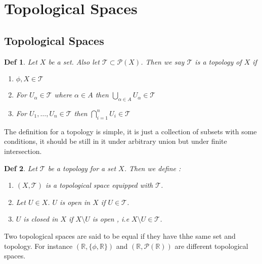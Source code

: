 \documentclass[paper=a4, fontsize=11pt]{scrartcl}
\newcommand{\T}{\mathcal{T}}
\newtheorem{definition}{Def}
\begin{document}
\vspace{0.15in}
\section{Topological Spaces}
\vspace{0.15in}

\subsection{Topological Spaces}
\vspace{0.1in}

\begin{definition}
	Let $X$ be a set. Also let $\mathcal{T}\subset \mathcal{P}(X)$. Then we say $\mathcal{T}$ is a topology of $X$ if 
	\begin{enumerate}\nonumber
		\item $\phi,X \in \T$
		\item For $U_\alpha \in \T$ where $\alpha \in A$ then $\bigcup\limits_{\alpha \in A} U_\alpha \in \T$
		\item For $U_1,\dots,U_n \in \T$ then $\bigcap\limits_{i=1}^n U_i \in \T$ \\
	\end{enumerate} 
\end{definition}

The definition for a topology is simple, it is just a collection of subsets with some conditions, it should be still in it under arbitrary union but under finite intersection.

\vspace{0.15in}

\begin{definition}
	Let $\T$ be a topology for a set $X$. Then we define :
	\begin{enumerate}[label=\arabic*)]
		\item $(X,\T)$ is a topological space equipped with $\T$.
		\item Let $U \in X$. $U$ is open in $X$ if $U\in \T$.
		\item $U$ is closed in $X$ if $X \setminus U$ is open , i.e $X\setminus U \in \T$.\\
	\end{enumerate}
\end{definition}

Two topological spaces are said to be equal if they have thhe same set and topology. For instance $(\mathbb{R} , \{ \phi, \mathbb{R} \})$ and $(\mathbb{R}, \mathcal{P}(\mathbb{R}))$ are different topological spaces.\\
\end{document}
